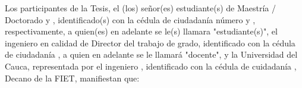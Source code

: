 Los participantes de la Tesis, el (los) señor(es) estudiante(s) de Maestría / Doctorado \underline{\hspace{10ex}} \underline{\hspace{20ex}} y \underline{\hspace{20ex}}, identificado(s) con la cédula de ciudadanía número \underline{\hspace{11ex}} y \underline{\hspace{11ex}}, respectivamente, a quien(es) en adelante se le(s) llamara "estudiante(s)", el ingeniero \underline{\hspace{20ex}} en calidad de Director del trabajo de grado, identificado con la cédula de ciudadanía \underline{\hspace{12ex}}, a quien en adelante se le llamará "docente", y la Universidad del Cauca, representada por el ingeniero \underline{\hspace{20ex}}, identificado con la cédula de cuidadanía \underline{\hspace{10ex}}, Decano de la FIET, manifiestan que:

